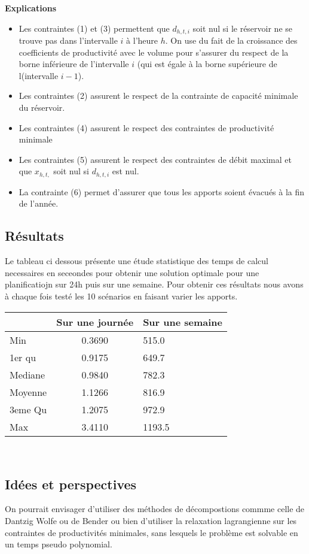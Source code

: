 \documentclass[a4paper]{report}
\begin{document}
\textbf{Explications}
\begin{itemize}
\item Les contraintes (1) et (3) permettent que $d_{h,t,i}$ soit nul si le réservoir ne se trouve pas dans l'intervalle $i$ à l'heure $h$. On use du fait de la croissance des coefficients de productivité
avec le volume pour s'assurer du respect de la borne inférieure de l'intervalle $i$ (qui est égale à la borne supérieure de l(intervalle $i-1$).
\item Les contraintes (2) assurent le respect de la contrainte de capacité minimale du réservoir.
\item Les contraintes (4) assurent le respect des contraintes de productivité minimale
\item Les contraintes (5) assurent le respect des contraintes de débit maximal et que $x_{h,t,}$ soit nul si $d_{h,t,i}$ est nul. 
\item La contrainte (6) permet d'assurer que tous les apports soient évacués à la fin de l'année.

\end{itemize}

\subsection{Résultats}
Le tableau ci dessous présente une étude statistique des temps de calcul necessaires en seceondes pour obtenir une solution optimale pour une planificatiojn sur 24h puis sur une semaine. Pour obtenir ces résultats nous avons à chaque fois testé les 10 scénarios en faisant varier les apports.\\
\begin{tabular}{|l|c|l|}
  \hline
  &Sur une journée&Sur une semaine\\
  \hline
  Min &0.3690 &515.0\\
  \hline
  1er qu & 0.9175&649.7  
\\
  \hline
  Mediane & 0.9840&782.3  
\\
  \hline
  Moyenne &1.1266 & 816.9  
\\
  \hline
  3eme Qu &1.2075&972.9\\
  \hline
  Max & 3.4110 &1193.5\\

 
  \hline
\end{tabular}
\\
\subsection{Idées et perspectives}
On pourrait envisager d'utiliser des méthodes de décompostions commme celle de Dantzig Wolfe ou de Bender ou bien d'utiliser la relaxation lagrangienne sur les contraintes de productivités minimales, sans lesquels le problème est solvable en un temps pseudo polynomial.
\end{document}

